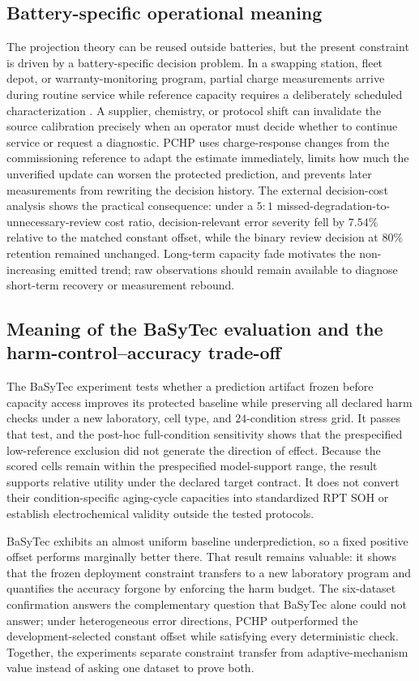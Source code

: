 \documentclass[preprint,12pt]{elsarticle}
\begin{document}
\subsection{Battery-specific operational meaning}

The projection theory can be reused outside batteries, but the present constraint is driven by a battery-specific decision problem. In a swapping station, fleet depot, or warranty-monitoring program, partial charge measurements arrive during routine service while reference capacity requires a deliberately scheduled characterization \citep{liu2023rapid,zhang2024flexible}. A supplier, chemistry, or protocol shift can invalidate the source calibration precisely when an operator must decide whether to continue service or request a diagnostic. PCHP uses charge-response changes from the commissioning reference to adapt the estimate immediately, limits how much the unverified update can worsen the protected prediction, and prevents later measurements from rewriting the decision history. The external decision-cost analysis shows the practical consequence: under a $5{:}1$ missed-degradation-to-unnecessary-review cost ratio, decision-relevant error severity fell by $7.54\%$ relative to the matched constant offset, while the binary review decision at $80\%$ retention remained unchanged. Long-term capacity fade motivates the non-increasing emitted trend; raw observations should remain available to diagnose short-term recovery or measurement rebound.

\subsection{Meaning of the BaSyTec evaluation and the harm-control--accuracy trade-off}

The BaSyTec experiment tests whether a prediction artifact frozen before capacity access improves its protected baseline while preserving all declared harm checks under a new laboratory, cell type, and $24$-condition stress grid. It passes that test, and the post-hoc full-condition sensitivity shows that the prespecified low-reference exclusion did not generate the direction of effect. Because the scored cells remain within the prespecified model-support range, the result supports relative utility under the declared target contract. It does not convert their condition-specific aging-cycle capacities into standardized RPT SOH or establish electrochemical validity outside the tested protocols.

BaSyTec exhibits an almost uniform baseline underprediction, so a fixed positive offset performs marginally better there. That result remains valuable: it shows that the frozen deployment constraint transfers to a new laboratory program and quantifies the accuracy forgone by enforcing the harm budget. The six-dataset confirmation answers the complementary question that BaSyTec alone could not answer; under heterogeneous error directions, PCHP outperformed the development-selected constant offset while satisfying every deterministic check. Together, the experiments separate constraint transfer from adaptive-mechanism value instead of asking one dataset to prove both.
\end{document}
